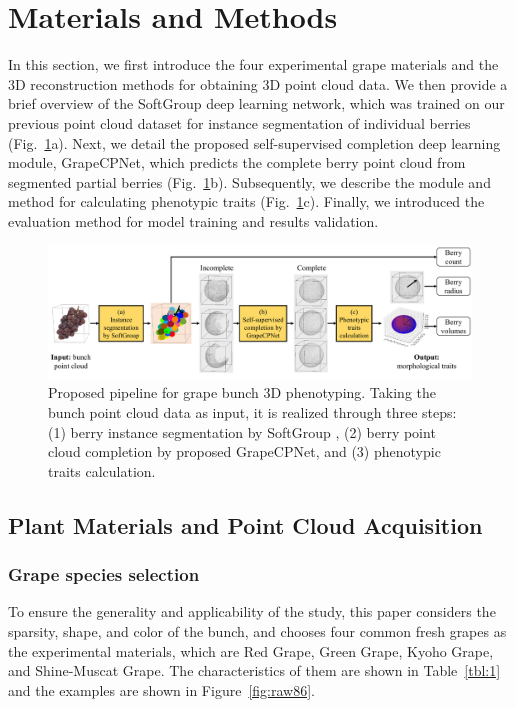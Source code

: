 \documentclass[12pt]{article}
\begin{document}
\section{Materials and Methods}

In this section, we first introduce the four experimental grape materials and the 3D reconstruction methods for obtaining 3D point cloud data. 
We then provide a brief overview of the SoftGroup \citep{vu_softgroup_2022} deep learning network, which was trained on our previous point cloud dataset for instance segmentation of individual berries (Fig.~\ref{fig:raw1}a). 
Next, we detail the proposed self-supervised completion deep learning module, GrapeCPNet, which predicts the complete berry point cloud from segmented partial berries (Fig.~\ref{fig:raw1}b). 
Subsequently, we describe the module and method for calculating phenotypic traits (Fig.~\ref{fig:raw1}c). 
Finally, we introduced the evaluation method for model training and results validation.

\begin{figure}[hbt!]
    \centering
    \includegraphics[width=1\textwidth]{figures/Figure1.pdf}
    \caption{Proposed pipeline for grape bunch 3D phenotyping. Taking the bunch point cloud data as input, it is realized through three steps: (1) berry instance segmentation by SoftGroup \citep{vu_softgroup_2022}, (2) berry point cloud completion by proposed GrapeCPNet, and (3) phenotypic traits calculation.}
    \label{fig:raw1}
\end{figure}

\subsection{Plant Materials and Point Cloud Acquisition}

\subsubsection{Grape species selection}

To ensure the generality and applicability of the study, this paper considers the sparsity, shape, and color of the bunch, and chooses four common fresh grapes as the experimental materials, which are Red Grape, Green Grape, Kyoho Grape, and Shine-Muscat Grape. 
The characteristics of them are shown in Table~\ref{tbl:1} and the examples are shown in Figure~\ref{fig:raw86}.
\end{document}
